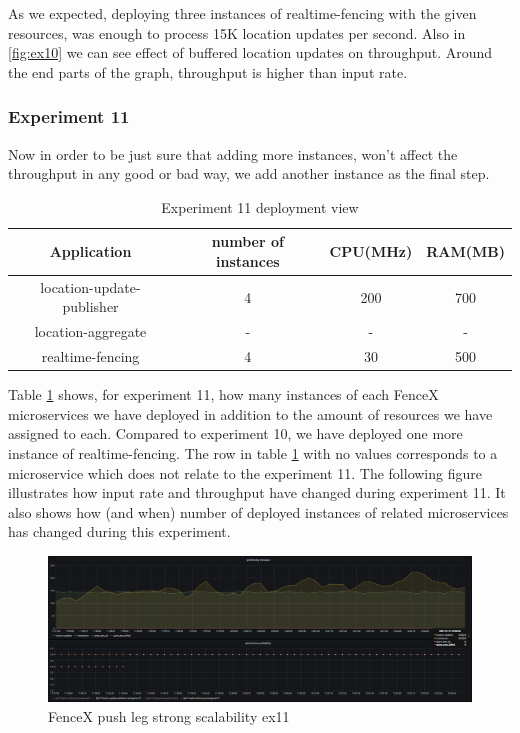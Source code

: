 \documentclass[a4]{report}
\begin{document}
    As we expected, deploying three instances of realtime-fencing with the given resources, was enough to process 15K
    location updates per second.
    Also in \ref{fig:ex10} we can see effect of buffered location updates on throughput.
    Around the end parts of the graph, throughput is higher than input rate.

    \clearpage

    \subsubsection{Experiment 11}
    Now in order to be just sure that adding more instances, won't affect the throughput in any good or bad way, we
    add another instance as the final step.

    \begin{table}[h!]
        \centering
        \begin{tabular}{|c|c|c|c|}
            \hline
            Application               & number of instances & CPU(MHz) & RAM(MB) \\
            \hline
            location-update-publisher & 4                   & 200      & 700     \\
            location-aggregate        & -                   & -        & -       \\
            realtime-fencing          & 4                   & 30       & 500     \\
            \hline
        \end{tabular}
        \caption{Experiment 11 deployment view}
        \label{table:ex11-dv}
    \end{table}

    Table \ref{table:ex11-dv} shows, for experiment 11, how many instances of each FenceX microservices we have
    deployed in addition to the amount of resources we have assigned to each.
    Compared to experiment 10, we have deployed one more instance of realtime-fencing.
    The row in table \ref{table:ex11-dv} with no values corresponds to a microservice which does not relate to the
    experiment 11.
    The following figure illustrates how input rate and throughput have changed during experiment 11.
    It also shows how (and when) number of deployed instances of related microservices has changed during this
    experiment.

    \begin{figure}[h!]
        \centering
        \caption{FenceX push leg strong scalability ex11}
        \label{fig:ex11}
        \includegraphics[width=\linewidth, scale=2]{images/evaluation/ex11-benchmarking-ongoing-2per4sec.png}
    \end{figure}
\end{document}
